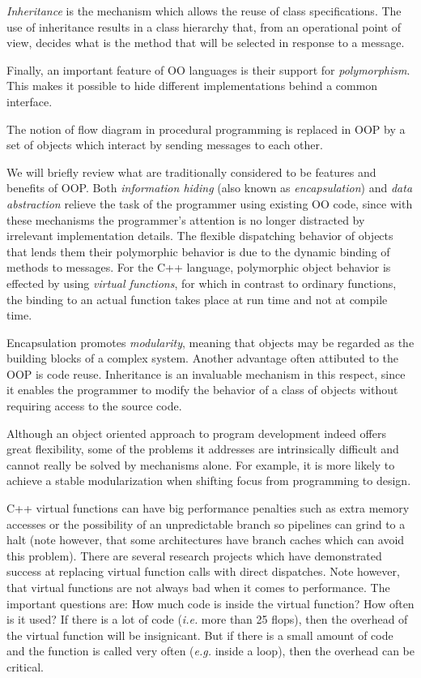 \emph{Inheritance} is the mechanism which allows the reuse of class
specifications. The use of inheritance results in a class hierarchy
that, from an operational point of view, decides what is the method
that will be selected in response to a message.

Finally, an important feature of OO languages is their support for
\emph{polymorphism}. This makes it possible to hide different
implementations behind a common interface.

The notion of flow diagram in procedural programming is replaced in
OOP by a set of objects which interact by sending messages to each
other. 

We will briefly review what are traditionally considered to be
features and benefits of OOP. Both \emph{information hiding} (also
known as \emph{encapsulation}) and \emph{data abstraction} relieve the
task of the programmer using existing OO code, since with these
mechanisms the programmer's attention is no longer distracted by
irrelevant implementation details. The flexible dispatching behavior
of objects that lends them their polymorphic behavior is due to the
dynamic binding of methods to messages. For the C++ language,
polymorphic object behavior is effected by using \emph{virtual
functions}, for which in contrast to ordinary functions, the binding
to an actual function takes place at run time and not at compile time.

Encapsulation promotes \emph{modularity}, meaning that objects may be
regarded as the building blocks of a complex system. Another advantage
often attibuted to the OOP is code reuse. Inheritance is an invaluable
mechanism in this respect, since it enables the programmer to modify
the behavior of a class of objects without requiring access to the
source code.

Although an object oriented approach to program development indeed
offers great flexibility, some of the problems it addresses are
intrinsically difficult and cannot really be solved by mechanisms
alone. For example, it is more likely to achieve a stable
modularization when shifting focus from programming to design.

C++ virtual functions \cite{todd} can have big performance penalties
such as extra memory accesses or the possibility of an unpredictable
branch so pipelines can grind to a halt (note however, that some
architectures have branch caches which can avoid this problem). There
are several research projects which have demonstrated success at
replacing virtual function calls with direct dispatches. Note however,
that virtual functions are not always bad when it comes to
performance. The important questions are: How much code is inside the
virtual function? How often is it used? If there is a lot of code
(\emph{i.e.} more than 25 flops), then the overhead of the virtual
function will be insignicant. But if there is a small amount of code
and the function is called very often (\emph{e.g.}  inside a loop),
then the overhead can be critical.


